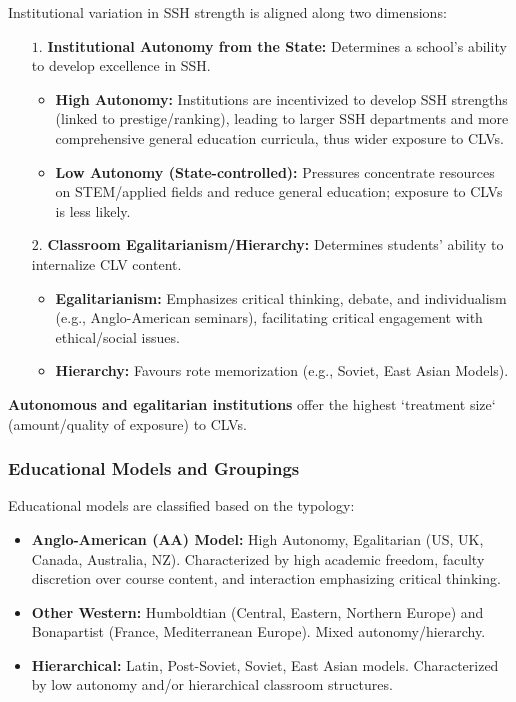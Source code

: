 \documentclass{article}
\begin{document}
    \noindent Institutional variation in SSH strength is aligned along two
dimensions:
    \begin{itemize}
        \item [$1$.] \textbf{Institutional Autonomy from the State:}
        Determines a school's ability to develop excellence in SSH.
        \begin{itemize}
            \item \textbf{High Autonomy:} Institutions are incentivized to
            develop SSH strengths (linked to prestige/ranking), leading to
            larger SSH departments and more comprehensive general education
            curricula, thus wider exposure to CLVs.
            \item \textbf{Low Autonomy (State-controlled):} Pressures
            concentrate resources on STEM/applied fields and reduce general
            education; exposure to CLVs is less likely.
        \end{itemize}
        \item[$2$.] \textbf{Classroom Egalitarianism/Hierarchy:} Determines
        students' ability to internalize CLV content.
        \begin{itemize}
            \item \textbf{Egalitarianism:} Emphasizes critical thinking,
            debate, and individualism (e.g., Anglo-American seminars),
            facilitating critical engagement with ethical/social issues.
            \item \textbf{Hierarchy:} Favours rote memorization (e.g.,
            Soviet, East Asian Models).
        \end{itemize}
    \end{itemize}

    \noindent \textbf{Autonomous and egalitarian institutions} offer the
highest `treatment size` (amount/quality of exposure) to CLVs.

    \subsubsection{Educational Models and Groupings}

    \noindent Educational models are classified based on the typology:
    \begin{itemize}
        \item \textbf{Anglo-American (AA) Model:} High Autonomy,
        Egalitarian (US, UK, Canada, Australia, NZ). Characterized by high
        academic freedom, faculty discretion over course content, and
        interaction emphasizing critical thinking.
        \item \textbf{Other Western:} Humboldtian (Central, Eastern,
        Northern Europe) and Bonapartist (France, Mediterranean Europe).
        Mixed autonomy/hierarchy.
        \item \textbf{Hierarchical:} Latin, Post-Soviet, Soviet, East Asian
        models. Characterized by low autonomy and/or hierarchical classroom
        structures.
    \end{itemize}


    
\end{document}
